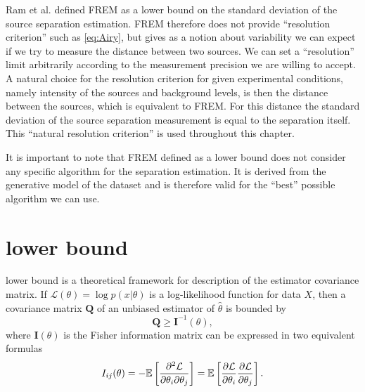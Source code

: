 Ram et al. defined FREM as a \CR lower bound on the standard deviation of the source separation estimation. FREM therefore does not provide ``resolution criterion'' such as \autoref{eq:Airy}, but gives as a notion about variability we can expect if we try to measure the distance between two sources. We can set a ``resolution'' limit arbitrarily according to the measurement precision we are willing to accept. A natural choice for the resolution criterion for given experimental conditions, namely intensity of the sources and background levels, is then the distance between the sources, which is equivalent to FREM. For this distance the standard deviation of the source separation measurement is equal to the separation itself. This ``natural resolution criterion'' is used throughout this chapter. 

It is important to note that FREM defined as a \CR lower bound does not consider any specific algorithm for the separation estimation. It is derived from the generative model of the dataset and is therefore valid for the ``best'' possible algorithm we can use. 




\section{\CR lower bound\label{sec:CR}}

\CR lower bound is a theoretical framework for description of the estimator covariance matrix. If $\mathcal{L}(\theta)=\log p(x|\theta)$ is a log-likelihood function for data $X$, then a covariance matrix $\bm{Q}$ of an unbiased estimator of $\hat{\theta}$ is bounded by \cite{Rao1945,Cover1991} 
%
\begin{equation}
	\bm{Q}\geq\bm{I}^{-1}(\theta),
	\label{eq:Covariance vs Fisher information}
\end{equation}
%
where $\bm{I}(\theta)$ is the Fisher information matrix can be expressed in two equivalent formulas
%
\begin{equation}
	I_{ij}(\theta)=-\mathbb{E}\left[\frac{\partial^2\mathcal{L}}{\partial\theta_i\partial\theta_j}\right]=\mathbb{E}\left[\frac{\partial\mathcal{L}}{\partial\theta_i}\frac{\partial\mathcal{L}}{\partial\theta_j}\right].
	\label{eq:Fisher information general}
\end{equation}


